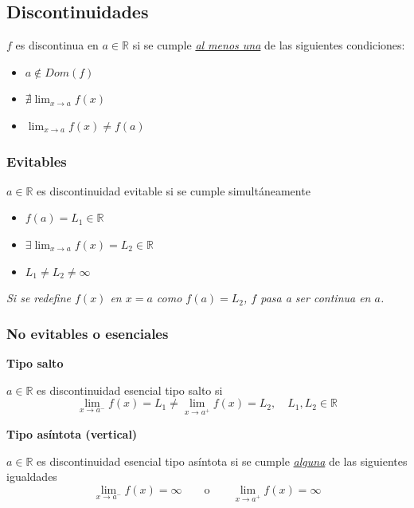 \documentclass[11pt,titlepage]{article}
\newcommand{\commLim}[2]{\lim_{#1 \to #2}}
\newcommand{\displayLim}[2]{\displaystyle \commLim{#1}{#2}}
\newcommand{\littleTitle}[1]{
	\noindent \ignorespaces
	\small \textbf{#1} \normalsize
	\ignorespaces \ignorespacesafterend
}
\begin{document}
\subsection{Discontinuidades}
$f$ es discontinua en $a \in \mathbb{R}$ si se cumple \underline{\emph{al menos una}} de las siguientes condiciones:
\begin{itemize}
	\item $a \notin Dom(f)$
	\item $\nexists \commLim{x}{a} f(x)$ 
	\item $\commLim{x}{a} f(x) \neq f(a)$ 
\end{itemize}

\subsubsection{Evitables}
$a \in \mathbb{R}$ es discontinuidad evitable si se cumple simultáneamente
\begin{multicols}{3}
	\begin{itemize}
		\item $f(a) = L_1 \in \mathbb{R}$
		\item $\exists \displayLim{x}{a} f(x) = L_2 \in \mathbb{R}$
		\item $L_1 \neq L_2 \neq \infty$
	\end{itemize}
\end{multicols}
\emph{Si se redefine $f(x)$ en $x = a$ como $f(a) = L_2$, $f$ pasa a ser continua en $a$.}

\subsubsection{No evitables o esenciales}

\littleTitle{Tipo salto}\par
$a \in \mathbb{R}$ es discontinuidad esencial tipo salto si
\begin{equation*}
	\commLim{x}{a^{-}} f(x) = L_1 \neq \commLim{x}{a^{+}} f(x) = L_2, \quad L_1, L_2 \in \mathbb{R}
\end{equation*}

\littleTitle{Tipo asíntota (vertical)}\par
$a \in \mathbb{R}$ es discontinuidad esencial tipo asíntota si se cumple \underline{\emph{alguna}} de las siguientes igualdades
\begin{equation*}
	\commLim{x}{a^{-}} f(x) = \infty \qquad \text{o} \qquad \commLim{x}{a^{+}} f(x) = \infty
\end{equation*}
\end{document}
